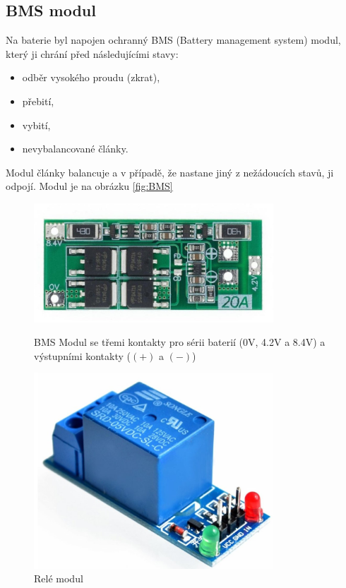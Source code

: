 \subsection{BMS modul}
Na baterie byl napojen ochranný BMS (Battery management system) modul, který ji chrání před následujícími stavy:
\begin{itemize}
  \item odběr vysokého proudu (zkrat),
  \item přebití,
  \item vybití,
  \item nevybalancované články.
\end{itemize}
Modul články balancuje a v případě, že nastane jiný z nežádoucích stavů, ji odpojí. Modul je na obrázku \ref{fig:BMS}


\begin{figure}[htb]
  \centering
  \begin{minipage}{0.45\textwidth}
    \centering
  \includegraphics[width=0.8\textwidth]{img/BMS.jpg}
  \caption{\label{fig:BMS} BMS Modul se třemi kontakty pro sérii baterií (0V, 4.2V a 8.4V) a výstupními kontakty ($(+)$ a $(-)$)~\cite{laskakit-BMS}}
  \end{minipage}\hfill
  \begin{minipage}{0.45\textwidth}
    \centering
  \includegraphics[width=0.8\textwidth]{img/relay.jpg}
  \caption{\label{fig:relay} Relé modul~\cite{laskakit-relay}}
  \end{minipage}
\end{figure}

